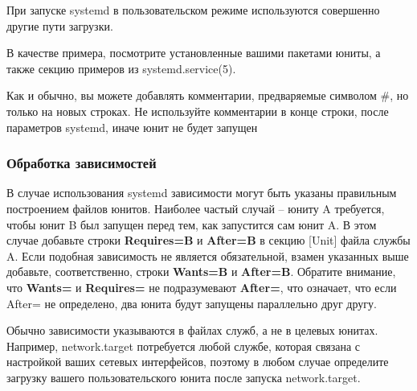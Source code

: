 \documentclass[a4paper,10pt,twoside]{article}
\begin{document}
 При запуске systemd в пользовательском режиме используются совершенно другие пути загрузки.

В качестве примера, посмотрите установленные вашими пакетами юниты, а также секцию примеров из systemd.service(5).

 Как и обычно, вы можете добавлять комментарии, предваряемые символом \#, но только на новых строках. Не используйте комментарии в конце строки, после параметров systemd, иначе юнит не будет запущен


\subsubsection{Обработка зависимостей}
В случае использования systemd зависимости могут быть указаны правильным построением файлов юнитов. Наиболее частый случай -- юниту A требуется, чтобы юнит B был запущен перед тем, как запустится сам юнит A. В этом случае добавьте строки \textbf{Requires=B} и \textbf{After=B} в секцию [Unit] файла службы A. Если подобная зависимость не является обязательной, взамен указанных выше добавьте, соответственно, строки \textbf{Wants=B} и \textbf{After=B}. Обратите внимание, что \textbf{Wants=} и \textbf{Requires=} не подразумевают \textbf{After=}, что означает, что если After= не определено, два юнита будут запущены параллельно друг другу.

Обычно зависимости указываются в файлах служб, а не в целевых юнитах. Например, network.target потребуется любой службе, которая связана с настройкой ваших сетевых интерфейсов, поэтому в любом случае определите загрузку вашего пользовательского юнита после запуска network.target.
\end{document}
